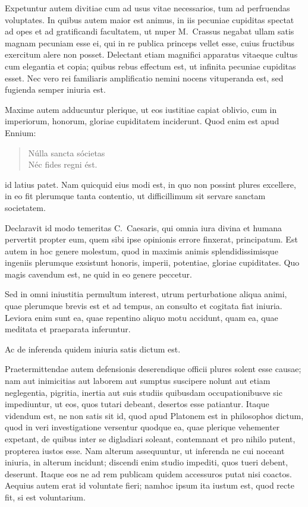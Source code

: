  Expetuntur autem divitiae cum ad usus vitae necessarios, tum ad perfruendas voluptates. In quibus autem maior est animus, in iis pecuniae cupiditas spectat ad opes et ad gratificandi facultatem, ut nuper M.~Crassus negabat ullam satis magnam pecuniam esse ei, qui in re publica princeps vellet esse, cuius fructibus exercitum alere non posset. Delectant etiam magnifici apparatus vitaeque cultus cum elegantia et copia; quibus rebus effectum est, ut infinita pecuniae cupiditas esset. Nec vero rei familiaris amplificatio nemini nocens vituperanda est, sed fugienda semper iniuria est.

 

 Maxime autem adducuntur plerique, ut eos iustitiae capiat oblivio, cum in imperiorum, honorum, gloriae cupiditatem inciderunt. Quod enim est apud Ennium:
\begin{verse}
Núlla sancta sócietas\\
Néc fides regni ést.
\end{verse}
id latius patet. Nam quicquid eius modi est, in quo non possint plures excellere, in eo fit plerumque tanta contentio, ut difficillimum sit servare sanctam societatem.

Declaravit id modo temeritas C.~Caesaris, qui omnia iura divina et humana pervertit propter eum, quem sibi ipse opinionis errore finxerat, principatum. Est autem in hoc genere molestum, quod in maximis animis splendidissimisque ingeniis plerumque exsistunt honoris, imperii, potentiae, gloriae cupiditates. Quo magis cavendum est, ne quid in eo genere peccetur.


 Sed in omni iniustitia permultum interest, utrum perturbatione aliqua animi, quae plerumque brevis est et ad tempus, an consulto et cogitata fiat iniuria. Leviora enim sunt ea, quae repentino aliquo motu accidunt, quam ea, quae meditata et praeparata inferuntur.

Ac de inferenda quidem iniuria satis dictum est.
 

 Praetermittendae autem defensionis deserendique officii plures solent esse causae; nam aut inimicitias aut laborem aut sumptus suscipere nolunt aut etiam neglegentia, pigritia, inertia aut suis studiis quibusdam occupationibusve sic impediuntur, ut eos, quos tutari debeant, desertos esse patiantur. Itaque videndum est, ne non satis sit id, quod apud Platonem est in philosophos dictum, quod in veri investigatione versentur quodque ea, quae plerique vehementer expetant, de quibus inter se digladiari soleant, contemnant et pro nihilo putent, propterea iustos esse. Nam alterum assequuntur, ut inferenda ne cui noceant iniuria, in alterum incidunt; discendi enim studio impediti, quos tueri debent, deserunt. Itaque eos ne ad rem publicam quidem accessuros putat nisi coactos. Aequius autem erat id voluntate fieri; namhoc ipsum ita iustum est, quod recte fit, si est voluntarium.

